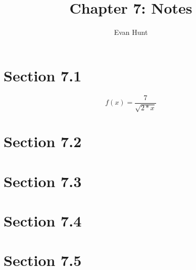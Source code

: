 \documentclass[12pt]{article}
\title{Chapter 7: Notes}
\author{Evan Hunt}
\begin{document}
    \maketitle

    \section[]{Section 7.1}
        \begin{equation}
            f(x) = \frac{7}{\sqrt{2*x}}
        \end{equation}
    \section[]{Section 7.2}
    \section[]{Section 7.3}
    \section[]{Section 7.4}
    \section[]{Section 7.5}
\end{document}
